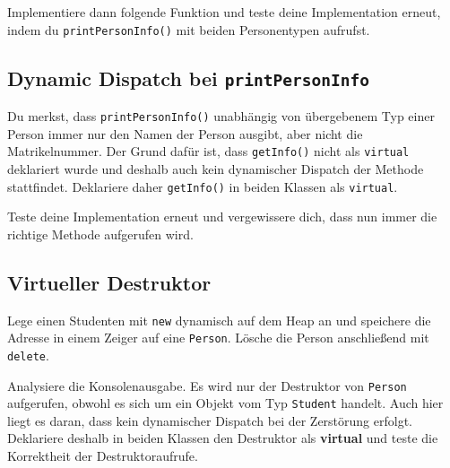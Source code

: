 Implementiere dann folgende Funktion und teste deine Implementation erneut, indem du \lstinline{printPersonInfo()} mit beiden Personentypen aufrufst.





\subsection{Dynamic Dispatch bei \lstinline{printPersonInfo}}
Du merkst, dass \lstinline{printPersonInfo()} unabhängig von übergebenem Typ einer Person immer nur den Namen der Person ausgibt, aber nicht die Matrikelnummer.
Der Grund dafür ist, dass \lstinline{getInfo()} nicht als \lstinline{virtual} deklariert wurde und deshalb auch kein dynamischer Dispatch der Methode stattfindet.
Deklariere daher \lstinline{getInfo()} in beiden Klassen als \lstinline{virtual}.

Teste deine Implementation erneut und vergewissere dich, dass nun immer die richtige Methode aufgerufen wird.


\subsection{Virtueller Destruktor}
Lege einen Studenten mit \lstinline{new} dynamisch auf dem Heap an und speichere die Adresse in einem Zeiger auf eine \lstinline{Person}.
Lösche die Person anschließend mit \lstinline{delete}.



Analysiere die Konsolenausgabe.
Es wird nur der Destruktor von \lstinline{Person} aufgerufen, obwohl es sich um ein Objekt vom Typ \lstinline{Student} handelt.
Auch hier liegt es daran, dass kein dynamischer Dispatch bei der Zerstörung erfolgt.
Deklariere deshalb in beiden Klassen den Destruktor als \textbf{virtual} und teste die Korrektheit der Destruktoraufrufe.

